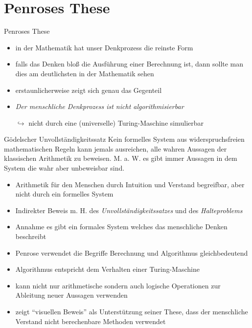 \section{Penroses These}
\label{sec:penrose}
\begin{frame}{Penroses These}
    \begin{itemize}
        \item in der Mathematik hat unser Denkprozess die reinste Form
        \item falls das Denken bloß die Ausführung einer Berechnung ist, dann sollte man dies am deutlichsten in der Mathematik sehen
        \item erstaunlicherweise zeigt sich genau das Gegenteil
        \item \emph{Der menschliche Denkprozess ist nicht algorithmisierbar}
        \item[$\hookrightarrow$] nicht durch eine (universelle) Turing-Maschine simulierbar
    \end{itemize}
\end{frame}

\begin{frame}
    \begin{block}{Gödelscher Unvollständigkeitssatz}
        Kein formelles System aus widerspruchsfreien mathematischen Regeln kann jemals ausreichen, alle wahren Aussagen der klassischen Arithmetik zu beweisen. M. a. W. es gibt immer Aussagen in dem System die wahr aber unbeweisbar sind.
    \end{block}
    \begin{itemize}
        \item Arithmetik für den Menschen durch Intuition und Verstand begreifbar, aber nicht durch ein formelles System
        \item Indirekter Beweis m. H. des \emph{Unvollständigkeitssatzes} und des \emph{Halteproblems}
        \item Annahme es gibt ein formales System welches das menschliche Denken beschreibt
    \end{itemize}
\end{frame}

\begin{frame}
    \begin{itemize}
        \item Penrose verwendet die Begriffe Berechnung und Algorithmus gleichbedeutend
        \item Algorithmus entspricht dem Verhalten einer Turing-Maschine
        \item kann nicht nur arithmetische sondern auch logische Operationen zur Ableitung neuer Aussagen verwenden
        \item zeigt \enquote{visuellen Beweis} als Unterstützung seiner These, dass der menschliche Verstand nicht berechenbare Methoden verwendet
    \end{itemize}
\end{frame}

